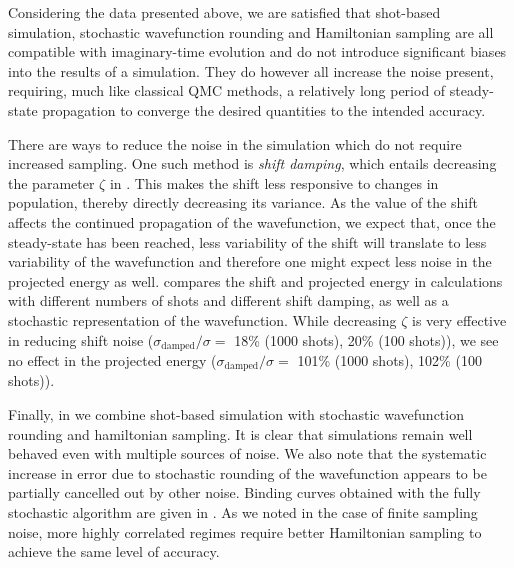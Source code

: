 \documentclass[%
 reprint,
 amsmath,amssymb,
 aps,
]{revtex4-2}
\begin{document}
Considering the data presented above, we are satisfied that shot-based simulation, stochastic wavefunction rounding and Hamiltonian sampling are all compatible with imaginary-time evolution and do not introduce significant biases into the results of a simulation. They do however all increase the noise present, requiring, much like classical QMC methods, a relatively long period of steady-state propagation to converge the desired quantities to the intended accuracy.


There are ways to reduce the noise in the simulation which do not require increased sampling. One such method is \textit{shift damping},\cite{Booth2009} which entails decreasing the parameter $\zeta$ in . This makes the shift less responsive to changes in population, thereby directly decreasing its variance. As the value of the shift affects the continued propagation of the wavefunction, we expect that, once the steady-state has been reached, less variability of the shift will translate to less variability of the wavefunction and therefore one might expect less noise in the projected energy as well.  compares the shift and projected energy in calculations with different numbers of shots and different shift damping, as well as a stochastic representation of the wavefunction. While decreasing $\zeta$ is very effective in reducing shift noise ($\sigma_\mathrm{damped}/\sigma =$ 18\% (1000 shots), 20\% (100 shots)), we see no effect in the projected energy ($\sigma_\mathrm{damped}/\sigma =$ 101\% (1000 shots), 102\% (100 shots)).

Finally, in  we combine shot-based simulation with stochastic wavefunction rounding and hamiltonian sampling. It is clear that simulations remain well behaved even with multiple sources of noise. We also note that the systematic increase in error due to stochastic rounding of the wavefunction appears to be partially cancelled out by other noise. Binding curves obtained with the fully stochastic algorithm are given in . As we noted in the case of finite sampling noise, more highly correlated regimes require better Hamiltonian sampling to achieve the same level of accuracy.
\end{document}

